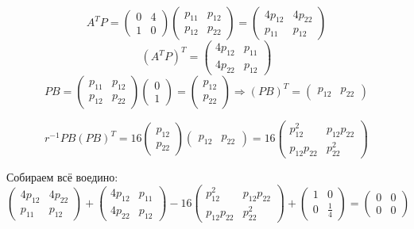 \documentclass[a4paper,12pt]{article}
\begin{document}
\[ A^T P = \begin{pmatrix}
    0 & 4 \\
    1 & 0
\end{pmatrix} \begin{pmatrix}
p_{11} & p_{12} \\
p_{12} & p_{22}
\end{pmatrix} = \begin{pmatrix}
4 p_{12} & 4 p_{22} \\
p_{11} & p_{12}
\end{pmatrix} \]
\[ (A^T P)^T = \begin{pmatrix}
4 p_{12} &  p_{11} \\
4 p_{22} & p_{12}
\end{pmatrix} \]
\[ PB = \begin{pmatrix}
    p_{11} & p_{12} \\
    p_{12} & p_{22}
\end{pmatrix} \begin{pmatrix}
0 \\ 1
\end{pmatrix} = \begin{pmatrix}
p_{12} \\ p_{22}
\end{pmatrix} \Rightarrow (PB)^T =  \begin{pmatrix}
p_{12} & p_{22}
\end{pmatrix} \]

\[ r^{-1} PB (PB)^T = 16 \begin{pmatrix}
    p_{12} \\ p_{22}
\end{pmatrix} \begin{pmatrix}
p_{12} & p_{22}
\end{pmatrix} = 16 \begin{pmatrix}
p_{12}^2 & p_{12} p_{22} \\
p_{12} p_{22} & p_{22}^2
\end{pmatrix} \]

Собираем всё воедино:
\[ \begin{pmatrix}
    4 p_{12} & 4 p_{22} \\
    p_{11} & p_{12}
\end{pmatrix} + \begin{pmatrix}
4 p_{12} &  p_{11} \\
4 p_{22} & p_{12}
\end{pmatrix} - 16 \begin{pmatrix}
p_{12}^2 & p_{12} p_{22} \\
p_{12} p_{22} & p_{22}^2
\end{pmatrix} + \begin{pmatrix}
1 & 0 \\
0 & \frac{1}{4}
\end{pmatrix} = \begin{pmatrix}
0 & 0 \\
0 & 0
\end{pmatrix} \]
\end{document}
